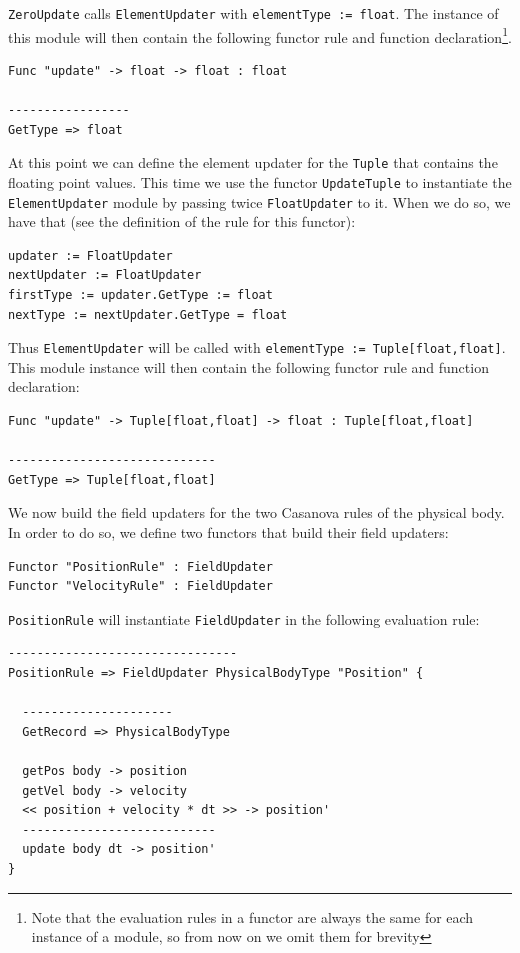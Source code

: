 \noindent
\texttt{ZeroUpdate} calls \texttt{ElementUpdater} with \texttt{elementType := float}. The instance of this module will then contain the following functor rule and function declaration\footnote{Note that the evaluation rules in a functor are always the same for each instance of a module, so from now on we omit them for brevity}.

\begin{lstlisting}
Func "update" -> float -> float : float

-----------------
GetType => float
\end{lstlisting}

\noindent
At this point we can define the element updater for the \texttt{Tuple} that contains the floating point values. This time we use the functor \texttt{UpdateTuple} to instantiate the \texttt{ElementUpdater} module by passing twice \texttt{FloatUpdater} to it. When we do so, we have that (see the definition of the rule for this functor):

\begin{lstlisting}
updater := FloatUpdater
nextUpdater := FloatUpdater
firstType := updater.GetType := float
nextType := nextUpdater.GetType = float
\end{lstlisting}

\noindent
Thus \texttt{ElementUpdater} will be called with \texttt{elementType := Tuple[float,float]}. This module instance will then contain the following functor rule and function declaration:

\begin{lstlisting}
Func "update" -> Tuple[float,float] -> float : Tuple[float,float]

-----------------------------
GetType => Tuple[float,float]
\end{lstlisting}

\noindent
We now build the field updaters for the two Casanova rules of the physical body. In order to do so, we define two functors that build their field updaters:

\begin{lstlisting}
Functor "PositionRule" : FieldUpdater
Functor "VelocityRule" : FieldUpdater
\end{lstlisting}

\noindent
\texttt{PositionRule} will instantiate \texttt{FieldUpdater} in the following evaluation rule:

\begin{lstlisting}
--------------------------------
PositionRule => FieldUpdater PhysicalBodyType "Position" {

  ---------------------
  GetRecord => PhysicalBodyType

  getPos body -> position
  getVel body -> velocity
  << position + velocity * dt >> -> position'
  ---------------------------
  update body dt -> position'
}
\end{lstlisting}


